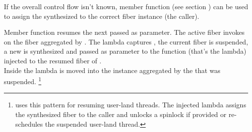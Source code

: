 If the overall control flow isn't known, member function \resumewith (see section
) can be used to assign the synthesized to the correct fiber
instance (the caller).

Member function  resumes the next  passed as
parameter. The active fiber invokes \resumewith on the fiber aggregated by
. The lambda captures , the current fiber is suspended, a
new \fiber is synthesized and passed as parameter  to the function
(that's the lambda) injected to the resumed fiber of .\\
Inside the lambda  is moved into the instance  aggregated by the
 that was suspended.
\footnote{\bfiber\cite{bfiber} uses this pattern for resuming user-land threads.
The injected lambda assigns the synthesized fiber to the caller and unlocks a
spinlock if provided or re-schedules the suspended user-land thread.}

